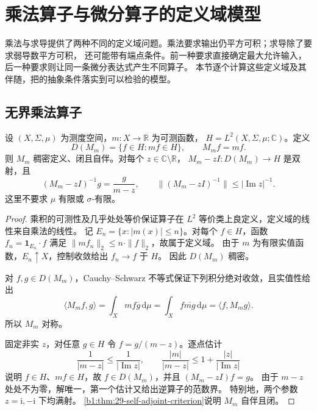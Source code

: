 \section{乘法算子与微分算子的定义域模型}
\label{b1:sec:2907}


乘法与求导提供了两种不同的定义域问题。乘法要求输出仍平方可积；求导除了要求弱导数平方可积，
还可能带有端点条件。前一种要求直接确定最大允许输入，后一种要求则让同一条微分表达式产生不同算子。
本节逐个计算这些定义域及其伴随，把的抽象条件落实到可以检验的模型。

\subsection{无界乘法算子}
\label{b1:subsec:290701}

\begin{theorem}[实可测函数的最大域乘法算子]
\label{b1:thm:29-real-multiplication}
设 \((X,\Sigma,\mu)\) 为测度空间，\(m:X\to\mathbb R\) 为可测函数，
\(H=L^2(X,\Sigma,\mu;\mathbb C)\)。定义
\[
 D(M_m)=\{f\in H:mf\in H\},\qquad M_mf=mf.
\]
则 \(M_m\) 稠密定义、闭且自伴。对每个 \(z\in\mathbb C\setminus\mathbb R\)，
\(M_m-zI:D(M_m)\to H\) 是双射，且
\begin{equation}\label{b1:eq:29-multiplication-resolvent}
 (M_m-zI)^{-1}g=\frac{g}{m-z},\qquad
 \|(M_m-zI)^{-1}\|\leq|\operatorname{Im}z|^{-1}.
\end{equation}
这里不要求 \(\mu\) 有限或 \(\sigma\)-有限。
\end{theorem}
\begin{proof}
乘积的可测性及几乎处处等价保证算子在 \(L^2\) 等价类上良定义，定义域的线性来自乘法的线性。
记 \(E_n=\{x:|m(x)|\leq n\}\)。对每个 \(f\in H\)，函数
\(f_n=\mathbf1_{E_n}\cdot f\) 满足 \(\|mf_n\|_2\leq n\cdot\|f\|_2\)，故属于定义域。
由于 \(m\) 为有限实值函数，\(E_n\uparrow X\)，控制收敛给出 \(f_n\to f\) 于 \(H\)。
因此 \(D(M_m)\) 稠密。

对 \(f,g\in D(M_m)\)，Cauchy--Schwarz 不等式保证下列积分绝对收敛，且实值性给出
\[
 \langle M_mf,g\rangle
 =\int_Xmf\overline g\,\mathrm d\mu
 =\int_Xf\overline{mg}\,\mathrm d\mu
 =\langle f,M_mg\rangle.
\]
所以 \(M_m\) 对称。

固定非实 \(z\)，对任意 \(g\in H\) 令 \(f=g/(m-z)\)。逐点估计
\[
 \frac1{|m-z|}\leq\frac1{|\operatorname{Im}z|},\qquad
 \frac{|m|}{|m-z|}\leq1+\frac{|z|}{|\operatorname{Im}z|}
\]
说明 \(f\in H\)、\(mf\in H\)，故 \(f\in D(M_m)\)，并且 \((M_m-zI)f=g\)。
由于 \(m-z\) 处处不为零，解唯一，第一个估计又给出逆算子的范数界。
特别地，两个参数 \(z=\mathrm i,-\mathrm i\) 下均满射。
\cref{b1:thm:29-self-adjoint-criterion}说明 \(M_m\) 自伴且闭。
\end{proof}

